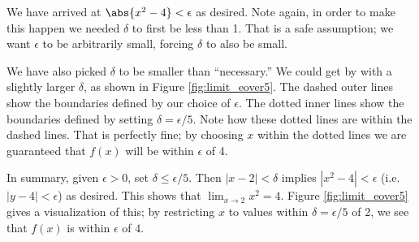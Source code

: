 {\noindent
We have arrived at $\abs{x^2 - 4}<\epsilon$ as desired.  Note again, in order to make this happen we needed $\delta$ to first be less than 1.  That is a safe assumption; we want $\epsilon$ to be arbitrarily small, forcing $\delta$ to also be small. 

We have also picked $\delta$ to be smaller than ``necessary.'' We could get by with a slightly larger $\delta$, as shown in Figure \ref{fig:limit_eover5}. The dashed outer lines show the boundaries defined by our choice of $\epsilon$. The dotted inner lines show the boundaries defined by setting $\delta = \epsilon/5$. Note how these dotted lines are within the dashed lines. That is perfectly fine; by choosing $x$ within the dotted lines we are guaranteed that $f(x)$ will be within $\epsilon$ of 4.%


In summary, given $\epsilon > 0$, set $\delta\leq\epsilon/5$.  Then $|x - 2| < \delta$ implies 
$|x^2 - 4|< \epsilon$ (i.e.\ $|y - 4|< \epsilon$) as desired.  This shows that $\displaystyle \lim_{x\rightarrow 2} x^2 = 4 $. Figure \ref{fig:limit_eover5} gives a visualization of this; by restricting $x$ to values within $\delta = \epsilon/5$ of 2, we see that $f(x)$ is within $\epsilon$ of $4$.
}\\

